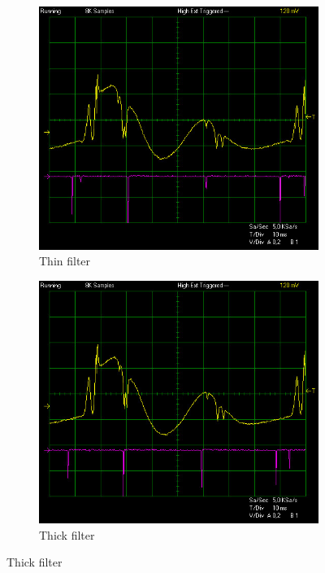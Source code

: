 \documentclass{article}
\begin{document}
\begin{figure}[h]
    \centering
    \begin{subfigure}[b]{0.3\textwidth}
        \centering
        \includegraphics[width=\linewidth]{Figures/3/110ThinFilter.jpg}
        \caption{Thin filter}
        \label{fig:figure0}
    \end{subfigure}
    \begin{subfigure}[b]{0.3\textwidth}
        \centering
        \includegraphics[width=\linewidth]{Figures/3/110ThickFilter.jpg}
        \caption{Thick filter}
        \label{fig:figure45}
    \end{subfigure}
\end{figure}
\end{document}
